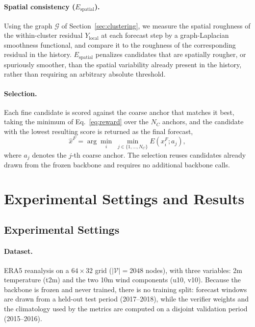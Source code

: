 \documentclass[preprint,12pt]{elsarticle}
\begin{document}
\paragraph{Spatial consistency ($E_{\text{spatial}}$).} Using the graph $\mathcal{G}$ of Section~\ref{sec:clustering}, we measure the spatial roughness of the within-cluster residual $Y_{\text{local}}$ at each forecast step by a graph-Laplacian smoothness functional, and compare it to the roughness of the corresponding residual in the history. $E_{\text{spatial}}$ penalizes candidates that are spatially rougher, or spuriously smoother, than the spatial variability already present in the history, rather than requiring an arbitrary absolute threshold.

\paragraph{Selection.} Each fine candidate is scored against the coarse anchor that matches it best, taking the minimum of Eq.~\eqref{eq:reward} over the $N_C$ anchors, and the candidate with the lowest resulting score is returned as the final forecast,
\begin{equation}
\hat{x}^F = \arg\min_{i} \; \min_{j \in \{1,\dots,N_C\}} E\!\left(x^F_i ; a_j\right),
\label{eq:selection2}
\end{equation}
where $a_j$ denotes the $j$-th coarse anchor. The selection reuses candidates already drawn from the frozen backbone and requires no additional backbone calls.



\section{Experimental Settings and Results}
\label{sec:settings}

\subsection{Experimental Settings}

\paragraph{Dataset.} ERA5 reanalysis on a $64\times32$ grid ($|\mathcal{V}|=2048$ nodes), with three variables: 2m temperature (t2m) and the two 10m wind components (u10, v10). Because the backbone is frozen and never trained, there is no training split: forecast windows are drawn from a held-out test period (2017--2018), while the verifier weights and the climatology used by the metrics are computed on a disjoint validation period (2015--2016).
\end{document}
